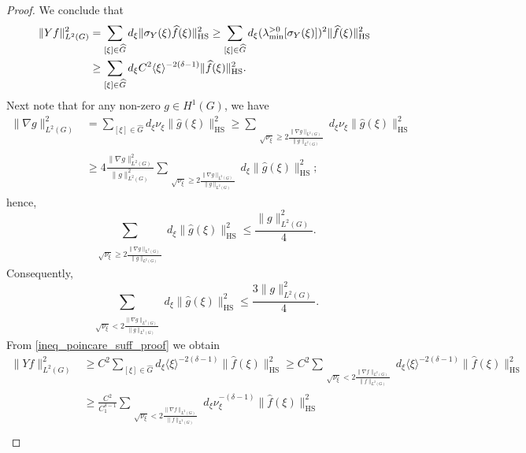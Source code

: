 \documentclass[11pt]{amsart}
\numberwithin{theorem}{section}
\numberwithin{equation}{section}
\theoremstyle{definition}
\numberwithin{example}{section}
\theoremstyle{definition}
\theoremstyle{definition}
\newcommand{\HS}{\operatorname{HS}}
\begin{document}
\begin{proof}
We conclude that
\begin{align}
    \|Yf\|_{L^2(G)}^2&=\sum_{[\xi]\in\widehat{G}}d_\xi\|\sigma_Y(\xi)\widehat{f}(\xi)\|_{\HS}^2\geq \sum_{[\xi]\in\widehat{G}}d_\xi(\lambda_{\min}^{>0}[\sigma_Y(\xi)])^2\|\widehat{f}(\xi)\|_{\HS}^2\notag\\
    &\geq \sum_{[\xi]\in\widehat{G}}d_\xi C^2\langle \xi \rangle^{-2(\delta-1)} \|\widehat{f}(\xi)\|_{\HS}^2.\label{ineq_poincare_suff_proof}
\end{align}
     Next note that for any non-zero $g\in H^1(G)$, we have
\begin{align*}
    \|\nabla g\|_{L^2(G)}^2&=\sum_{[\xi]\in\widehat{G}}d_\xi\nu_\xi\|\widehat{g}(\xi)\|_{\HS}^2\geq \sum_{\substack{\\
        \sqrt{\nu_\xi} \geq 2\frac{\|\nabla g\|_{L^2(G)}}{\|g\|_{L^2(G)}}}}d_\xi\nu_\xi\|\widehat{g}(\xi)\|_{\HS}^2\\
        &\geq 4\frac{\|\nabla g\|_{L^2(G)}^2}{\|g\|_{L^2(G)}^2}\sum_{\substack{\\
        \sqrt{\nu_\xi} \geq 2\frac{\|\nabla g\|_{L^2(G)}}{\|g\|_{L^2(G)}}}}d_\xi\|\widehat{g}(\xi)\|_{\HS}^2;
\end{align*}
hence,
\begin{equation*}
    \sum_{\substack{\\
        \sqrt{\nu_\xi} \geq 2\frac{\|\nabla g\|_{L^2(G)}}{\|g\|_{L^2(G)}}}}d_\xi\|\widehat{g}(\xi)\|_{\HS}^2\leq \frac{\|g\|_{L^2(G)}^2}{4}.
\end{equation*}
Consequently, 
    \begin{equation}\label{ineq_L^2_norm}
    \sum_{\substack{\\
        \sqrt{\nu_\xi} < 2\frac{\|\nabla g\|_{L^2(G)}}{\|g\|_{L^2(G)}}}}d_\xi\|\widehat{g}(\xi)\|_{\HS}^2\leq\frac{3\|g\|_{L^2(G)}^2}{4}. 
\end{equation}
 From  \eqref{ineq_poincare_suff_proof} we obtain
\begin{align*}
    \|Yf\|_{L^2(G)}^2&\geq C^2 \sum_{[\xi]\in\widehat{G}}d_\xi \langle \xi \rangle^{-2(\delta-1)} \|\widehat{f}(\xi)\|_{\HS}^2\geq  C^2\sum_{\substack{\\
        \sqrt{\nu_\xi} < 2\frac{\|\nabla f\|_{L^2(G)}}{\|f\|_{L^2(G)}}}}d_\xi\langle \xi \rangle^{-2(\delta-1)} \|\widehat{f}(\xi)\|_{\HS}^2\\
        &\geq \frac{C^2}{C_1^{\delta-1}}\sum_{\substack{\\
        \sqrt{\nu_\xi} < 2\frac{\|\nabla f\|_{L^2(G)}}{\|f\|_{L^2(G)}}}}d_\xi\nu_\xi^{-(\delta-1)} \|\widehat{f}(\xi)\|_{\HS}^2\\

\end{align*}
\end{proof}
\end{document}
